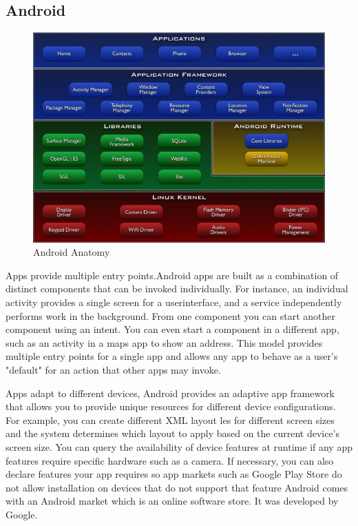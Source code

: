 \subsection{Android}
\begin{figure}[ht]
\centering
\includegraphics[scale=0.38]{images/a1.jpg}
\caption{Android Anatomy}
\label{fig:Anatomy}
\end{figure}

Apps provide multiple entry points.Android apps are built as a combination of distinct components that can be invoked individually. For instance, an individual activity provides a single screen for a userinterface, and a service independently performs work in the background. From one component you can start another component using an intent. You can even start a component in a different app, such as an activity in a maps app to show an
address. This model provides multiple entry points for a single app and allows any
app to behave as a user's "default" for an action that other apps may invoke.

Apps adapt to different devices, Android provides an adaptive app framework that allows you to provide unique resources for different device configurations. For example, you can create different XML layout les for different screen sizes and the system determines which layout
to apply based on the current device's screen size. You can query the availability of device features at runtime if any app features require specific hardware such as
a camera. If necessary, you can also declare features your app requires so app markets such as Google Play Store do not allow installation on devices that do not
support that feature Android comes with an Android market which is an online
software store. It was developed by Google.

